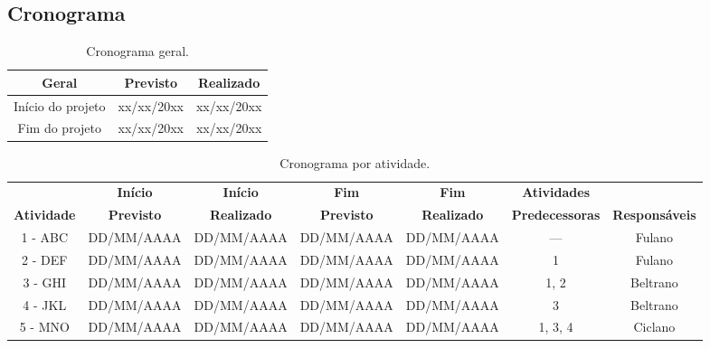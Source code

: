 \begin{landscape}

\chapter{Cronograma} 

\begin{table}[htpb]
\begin{center}
\caption{Cronograma geral.}
\begin{tabular}{|c|c|c|}
\hline
\textbf{Geral}          & \textbf{Previsto} & \textbf{Realizado} \\ \hline
Início do projeto       & xx/xx/20xx        & xx/xx/20xx         \\ \hline
Fim do projeto          & xx/xx/20xx        & xx/xx/20xx         \\ \hline
\end{tabular}
\end{center}
\end{table}

\begin{table}[htpb]
\begin{center}
\caption{Cronograma por atividade.}
\begin{tabular}{|c|c|c|c|c|c|c|}
\hline
& \textbf{Início} & \textbf{Início} & \textbf{Fim} & \textbf{Fim} & \textbf{Atividades} & \\
\textbf{Atividade} & \textbf{Previsto} & \textbf{Realizado} & \textbf{Previsto} & \textbf{Realizado} & \textbf{Predecessoras} & \textbf{Responsáveis}\\ \hline
1 - ABC                       & DD/MM/AAAA               & DD/MM/AAAA                & DD/MM/AAAA               & DD/MM/AAAA                & ---                               & Fulano \\ \hline
2 - DEF                       & DD/MM/AAAA               & DD/MM/AAAA                & DD/MM/AAAA               & DD/MM/AAAA                & 1                                 & Fulano \\ \hline
3 - GHI                       & DD/MM/AAAA               & DD/MM/AAAA                & DD/MM/AAAA               & DD/MM/AAAA                & 1, 2                              & Beltrano \\ \hline
4 - JKL                       & DD/MM/AAAA               & DD/MM/AAAA                & DD/MM/AAAA               & DD/MM/AAAA                & 3                                 & Beltrano \\ \hline
5 - MNO                       & DD/MM/AAAA               & DD/MM/AAAA                & DD/MM/AAAA               & DD/MM/AAAA                & 1, 3, 4                           & Ciclano \\ \hline
\end{tabular}
\end{center}
\end{table}




\end{landscape}
